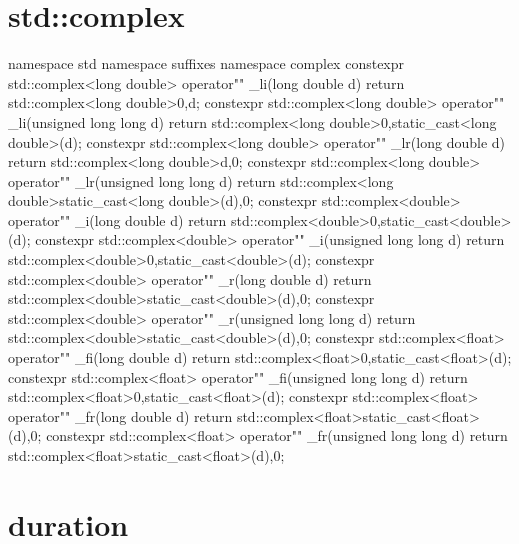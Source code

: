 \documentclass[ebook,11pt,article]{memoir}
\begin{document}
\section{std::complex}
\begin{codeblock}
namespace std{
namespace suffixes{
namespace complex{
constexpr
std::complex<long double> operator"" _li(long double d){
    return std::complex<long double>{0,d};
}
constexpr
std::complex<long double> operator"" _li(unsigned long long d){
    return std::complex<long double>{0,static_cast<long double>(d)};
}
constexpr
std::complex<long double> operator"" _lr(long double d){
    return std::complex<long double>{d,0};
}
constexpr
std::complex<long double> operator"" _lr(unsigned long long d){
    return std::complex<long double>{static_cast<long double>(d),0};
}
constexpr
std::complex<double> operator"" _i(long double d){
    return std::complex<double>{0,static_cast<double>(d)};
}
constexpr
std::complex<double> operator"" _i(unsigned long long d){
    return std::complex<double>{0,static_cast<double>(d)};
}
constexpr
std::complex<double> operator"" _r(long double d){
    return std::complex<double>{static_cast<double>(d),0};
}
constexpr
std::complex<double> operator"" _r(unsigned long long d){
    return std::complex<double>{static_cast<double>(d),0};
}
constexpr
std::complex<float> operator"" _fi(long double d){
    return std::complex<float>{0,static_cast<float>(d)};
}
constexpr
std::complex<float> operator"" _fi(unsigned long long d){
    return std::complex<float>{0,static_cast<float>(d)};
}
constexpr
std::complex<float> operator"" _fr(long double d){
    return std::complex<float>{static_cast<float>(d),0};
}
constexpr
std::complex<float> operator"" _fr(unsigned long long d){
    return std::complex<float>{static_cast<float>(d),0};
}
}
}
}
\end{codeblock}
\section{duration}
\end{document}
